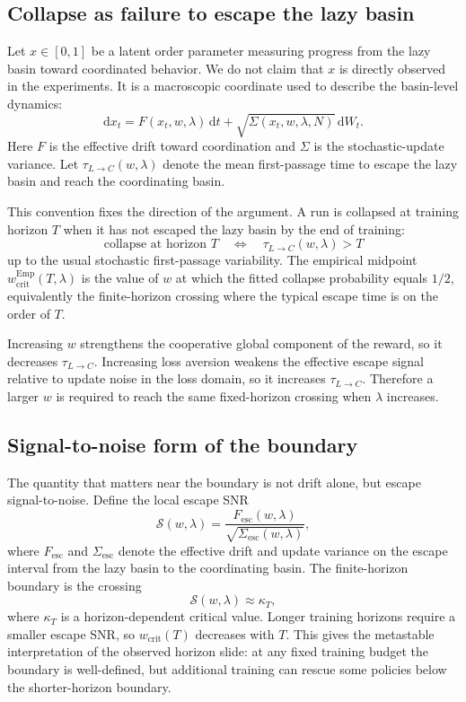 \documentclass[letterpaper]{article} %
\theoremstyle{plain}
\newcommand{\wcrit}{w_{\mathrm{crit}}}
\begin{document}
\subsection{Collapse as failure to escape the lazy basin}
Let $x\in[0,1]$ be a latent order parameter measuring progress from the lazy basin toward
coordinated behavior. We do not claim that $x$ is directly observed in the experiments. It is a
macroscopic coordinate used to describe the basin-level dynamics:
\begin{equation}
 \mathrm{d}x_t = F(x_t,w,\lambda)\,\mathrm{d}t
 + \sqrt{\Sigma(x_t,w,\lambda,N)}\,\mathrm{d}W_t .
 \label{eq:sde}
\end{equation}
Here $F$ is the effective drift toward coordination and $\Sigma$ is the stochastic-update variance.
Let $\tau_{L\to C}(w,\lambda)$ denote the mean first-passage time to escape the lazy basin and
reach the coordinating basin.

This convention fixes the direction of the argument. A run is collapsed at training horizon $T$
when it has not escaped the lazy basin by the end of training:
\begin{equation}
 \text{collapse at horizon }T
 \quad\Longleftrightarrow\quad
 \tau_{L\to C}(w,\lambda)>T
\end{equation}
up to the usual stochastic first-passage variability. The empirical midpoint
$\wcrit^{\mathrm{Emp}}(T,\lambda)$ is the value of $w$ at which the fitted collapse probability
equals $1/2$, equivalently the finite-horizon crossing where the typical escape time is on the
order of $T$.

Increasing $w$ strengthens the cooperative global component of the reward, so it decreases
$\tau_{L\to C}$. Increasing loss aversion weakens the effective escape signal relative to update
noise in the loss domain, so it increases $\tau_{L\to C}$. Therefore a larger $w$ is required to
reach the same fixed-horizon crossing when $\lambda$ increases.

\subsection{Signal-to-noise form of the boundary}
The quantity that matters near the boundary is not drift alone, but escape signal-to-noise. Define
the local escape SNR
\begin{equation}
 \mathcal{S}(w,\lambda)
 =
 \frac{F_{\mathrm{esc}}(w,\lambda)}
 {\sqrt{\Sigma_{\mathrm{esc}}(w,\lambda)}} ,
 \label{eq:escape_snr}
\end{equation}
where $F_{\mathrm{esc}}$ and $\Sigma_{\mathrm{esc}}$ denote the effective drift and update variance
on the escape interval from the lazy basin to the coordinating basin. The finite-horizon boundary
is the crossing
\begin{equation}
 \mathcal{S}(w,\lambda)\approx \kappa_T ,
\end{equation}
where $\kappa_T$ is a horizon-dependent critical value. Longer training horizons require a smaller
escape SNR, so $\wcrit(T)$ decreases with $T$. This gives the metastable interpretation of the
observed horizon slide: at any fixed training budget the boundary is well-defined, but additional
training can rescue some policies below the shorter-horizon boundary.
\end{document}
